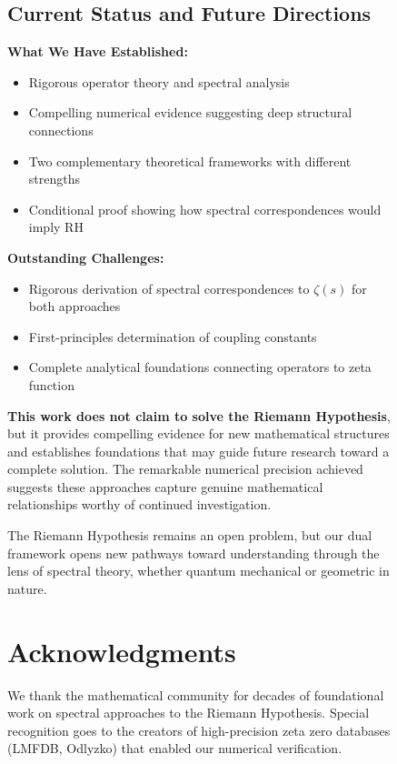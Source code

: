 \documentclass[12pt]{article}
\begin{document}
\begin{figure}[ht]
\subsection{Current Status and Future Directions}

\textbf{What We Have Established:}
\begin{itemize}
\item Rigorous operator theory and spectral analysis
\item Compelling numerical evidence suggesting deep structural connections
\item Two complementary theoretical frameworks with different strengths
\item Conditional proof showing how spectral correspondences would imply RH
\end{itemize}

\textbf{Outstanding Challenges:}
\begin{itemize}
\item Rigorous derivation of spectral correspondences to $\zeta(s)$ for both approaches
\item First-principles determination of coupling constants
\item Complete analytical foundations connecting operators to zeta function
\end{itemize}

\textbf{This work does not claim to solve the Riemann Hypothesis}, but it provides compelling evidence for new mathematical structures and establishes foundations that may guide future research toward a complete solution. The remarkable numerical precision achieved suggests these approaches capture genuine mathematical relationships worthy of continued investigation.

The Riemann Hypothesis remains an open problem, but our dual framework opens new pathways toward understanding through the lens of spectral theory, whether quantum mechanical or geometric in nature.

\section*{Acknowledgments}

We thank the mathematical community for decades of foundational work on spectral approaches to the Riemann Hypothesis. Special recognition goes to the creators of high-precision zeta zero databases (LMFDB, Odlyzko) that enabled our numerical verification.

\begin{thebibliography}{99}


\end{thebibliography}
\end{figure}
\end{document}
